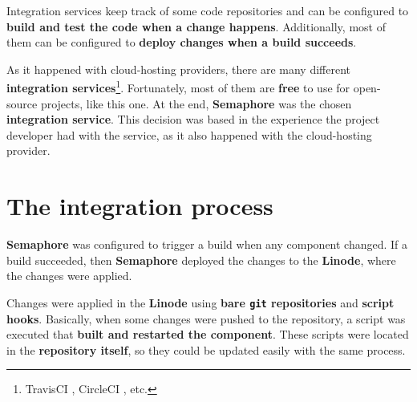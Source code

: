 \documentclass[a4paper,11pt,titlepage,abstract,numbers=noenddot,automark,mnsy,intlimits,rgb,dvipsnames]{report}
\begin{document}
Integration services keep track of some code repositories and can be configured to \textbf{build and test the code when a change 
happens}. Additionally, most of them can be configured to \textbf{deploy changes when a build succeeds}.

As it happened with cloud-hosting providers, there are many different \textbf{integration
services}\footnote{TravisCI \cite{travisci}, CircleCI \cite{circleci}, etc.}. Fortunately, most of them
are \textbf{free} to use for open-source projects, like this one. At the end, \textbf{Semaphore} \cite{semaphoreci} was the chosen
\textbf{integration service}. This decision was based in the experience the project developer had with the service, as it
also happened with the cloud-hosting provider.
\section{The integration process}
\textbf{Semaphore} was configured to trigger a build when any component
changed. If a build succeeded, then \textbf{Semaphore} deployed the changes to the \textbf{Linode}, where the changes were applied.

Changes were applied in the \textbf{Linode} using \textbf{bare \texttt{git} repositories} and \textbf{script hooks}. Basically,
when some changes were pushed to the repository, a script was executed that \textbf{built and restarted the component}.
These scripts were located in the \textbf{repository itself}, so they could be updated easily with the same process.
\end{document}
